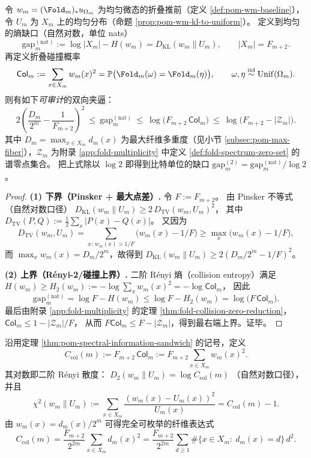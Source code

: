 \begin{theorem}\label{thm:pom-spectral-information-sandwich}
令 \(w_m=(\Fold_m)_*u_{\Omega_m}\) 为均匀微态的折叠推前（定义 \ref{def:pom-wm-baseline}），令 \(U_m\) 为 \(X_m\) 上的均匀分布（命题 \ref{prop:pom-wm-kl-to-uniform}）。
定义到均匀的熵缺口（自然对数，单位 nats）
\[
\mathrm{gap}_m^{(\mathrm{nat})}
:=\log|X_m|-H(w_m)
=D_{\mathrm{KL}}(w_m\|U_m),
\qquad |X_m|=F_{m+2}.
\]
再定义折叠碰撞概率
\[
\mathsf{Col}_m:=\sum_{x\in X_m}w_m(x)^2
=\mathbb{P}\bigl(\Fold_m(\omega)=\Fold_m(\eta)\bigr),
\qquad \omega,\eta\stackrel{\mathrm{iid}}{\sim}\mathrm{Unif}(\Omega_m).
\]
则有如下\emph{可审计}的双向夹逼：
\[
\boxed{\;
2\left(\frac{D_m}{2^m}-\frac{1}{F_{m+2}}\right)^2
\ \le\
\mathrm{gap}_m^{(\mathrm{nat})}
\ \le\
\log\!\bigl(F_{m+2}\,\mathsf{Col}_m\bigr)
\ \le\
\log\!\bigl(F_{m+2}-|\mathcal Z_m|\bigr).\;}
\]
其中 \(D_m=\max_{x\in X_m}d_m(x)\) 为最大纤维多重度（见小节 \ref{subsec:pom-max-fiber}），\(\mathcal Z_m\) 为附录 \ref{app:fold-multiplicity} 中定义 \ref{def:fold-spectrum-zero-set} 的谱零点集合。
把上式除以 \(\log 2\) 即得到比特单位的缺口 \(\mathrm{gap}_m^{(2)}=\mathrm{gap}_m^{(\mathrm{nat})}/\log 2\)。
\end{theorem}
\begin{proof}
\textbf{(1) 下界（Pinsker + 最大点差）.}
令 \(F:=F_{m+2}\)。
由 Pinsker 不等式（自然对数口径）
\(
D_{\mathrm{KL}}(w_m\|U_m)\ge 2\,D_{\mathrm{TV}}(w_m,U_m)^2
\)，
其中
\(
D_{\mathrm{TV}}(P,Q):=\frac12\sum_x|P(x)-Q(x)|
\)。
又因为
\[
D_{\mathrm{TV}}(w_m,U_m)
=\sum_{x:\,w_m(x)>1/F}\bigl(w_m(x)-1/F\bigr)
\ge \max_x\bigl(w_m(x)-1/F\bigr),
\]
而 \(\max_x w_m(x)=D_m/2^m\)，故得到
\(
D_{\mathrm{KL}}(w_m\|U_m)\ge 2(D_m/2^m-1/F)^2
\)。
\par
\textbf{(2) 上界（Rényi-2/碰撞上界）.}
二阶 Rényi 熵（collision entropy）满足
\(
H(w_m)\ge H_2(w_m):=-\log\sum_x w_m(x)^2=-\log \mathsf{Col}_m
\)，
因此
\[
\mathrm{gap}_m^{(\mathrm{nat})}
=\log F-H(w_m)
\le \log F-H_2(w_m)
=\log\bigl(F\,\mathsf{Col}_m\bigr).
\]
最后由附录 \ref{app:fold-multiplicity} 的定理 \ref{thm:fold-collision-zero-reduction}，
\(
\mathsf{Col}_m\le 1-|\mathcal Z_m|/F
\)，
从而 \(F\mathsf{Col}_m\le F-|\mathcal Z_m|\)，得到最右端上界。证毕。
\end{proof}

\begin{definition}[碰撞膨胀系数（可审计的二阶指纹）]\label{def:pom-collision-inflation}
沿用定理 \ref{thm:pom-spectral-information-sandwich} 的记号，定义
\[
C_{\mathrm{col}}(m)
:=F_{m+2}\,\mathsf{Col}_m
:=F_{m+2}\sum_{x\in X_m} w_m(x)^2.
\]
其对数即二阶 Rényi 散度：
\(
D_2(w_m\|U_m)=\log C_{\mathrm{col}}(m)
\)
（自然对数口径），并且
\[
\chi^2(w_m\|U_m)
:=\sum_{x\in X_m}\frac{(w_m(x)-U_m(x))^2}{U_m(x)}
=C_{\mathrm{col}}(m)-1.
\]
由 \(w_m(x)=d_m(x)/2^m\) 可得完全可枚举的纤维表达式
\[
C_{\mathrm{col}}(m)
=\frac{F_{m+2}}{2^{2m}}\sum_{x\in X_m} d_m(x)^2
=\frac{F_{m+2}}{2^{2m}}\sum_{d\ge 1}\#\{x\in X_m:\ d_m(x)=d\}\,d^2.
\]
\end{definition}

